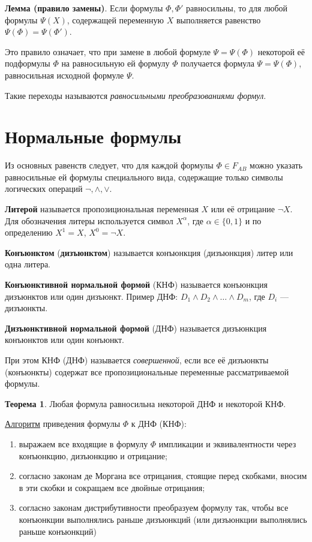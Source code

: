 \textbf{Лемма (правило замены)}. Если формулы $\Phi, \Phi'$ равносильны, то для любой формулы $\Psi(X)$, содержащей переменную $X$ выполняется равенство $\Psi(\Phi)=\Psi(\Phi')$.

Это правило означает, что при замене в любой формуле $\Psi = \Psi(\Phi)$ некоторой её подформулы $\Phi$ на равносильную ей формулу $\Phi$ получается формула $\Psi = \Psi(\Phi)$, равносильная исходной формуле $\Psi$.

Такие переходы называются \textit{равносильными преобразованиями формул}.

\section{Нормальные формулы}
Из основных равенств следует, что для каждой формулы $\Phi \in F_{AB}$ можно указать равносильные ей формулы специального вида, содержащие только символы логических операций $\lnot, \land, \lor$.

\dftion \textbf{Литерой} называется пропозициональная переменная $X$ или её отрицание $\lnot X$. Для обозначения литеры используется символ $X^\alpha$, где $\alpha \in \{0,1\}$ и по определению $X^1 = X$, $X^0 = \lnot X$.

\dftion \textbf{Конъюнктом} (\textbf{дизъюнктом}) называется конъюнкция (дизъюнкция) литер или одна литера.

\dftion \textbf{Конъюнктивной нормальной формой} (КНФ) называется конъюнкция дизъюнктов или один дизъюнкт. Пример ДНФ: $D_1 \land D_2 \land \dots \land D_m$, где $D_i$ --- дизъюнкты.

\textbf{Дизъюнктивной нормальной формой} (ДНФ) называется дизъюнкция конъюнктов или один конъюнкт.

При этом КНФ (ДНФ) называется \textit{совершенной}, если все её дизъюнкты (конъюнкты) содержат все пропозициональные переменные рассматриваемой формулы.

\textbf{Теорема 1}. Любая формула равносильна некоторой ДНФ и некоторой КНФ.

\underline{Алгоритм} приведения формулы $\Phi$ к ДНФ (КНФ):
\begin{enumerate}
    \item выражаем все входящие в формулу $\Phi$ импликации и эквивалентности через конъюнкцию, дизъюнкцию и отрицание;
    \item согласно законам де Моргана все отрицания, стоящие перед скобками, вносим в эти скобки и сокращаем все двойные отрицания;
    \item согласно законам дистрибутивности преобразуем формулу так, чтобы все конъюнкции выполнялись раньше дизъюнкций (или дизъюнкции выполнялись раньше конъюнкций)
\end{enumerate}

